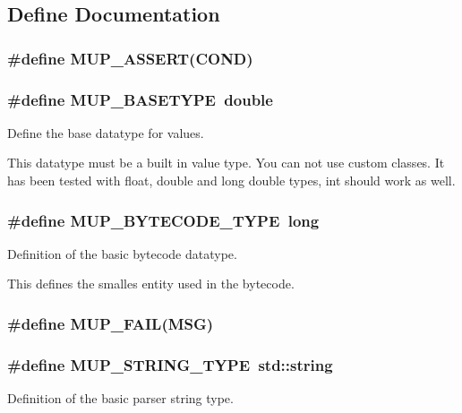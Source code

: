\subsection{Define Documentation}
\subsubsection[MUP\_\-ASSERT]{\setlength{\rightskip}{0pt plus 5cm}\#define MUP\_\-ASSERT(COND)}\label{muParserDef_8h_12c08d62c4a278b4e2ca3aad8e7af5e5}


\subsubsection[MUP\_\-BASETYPE]{\setlength{\rightskip}{0pt plus 5cm}\#define MUP\_\-BASETYPE~double}\label{muParserDef_8h_5a22a812cf29b119506daad01152f93a}


Define the base datatype for values. 

This datatype must be a built in value type. You can not use custom classes. It has been tested with float, double and long double types, int should work as well. 
\subsubsection[MUP\_\-BYTECODE\_\-TYPE]{\setlength{\rightskip}{0pt plus 5cm}\#define MUP\_\-BYTECODE\_\-TYPE~long}\label{muParserDef_8h_0f47e11fe6c191d2a956420a3f7174a8}


Definition of the basic bytecode datatype. 

This defines the smalles entity used in the bytecode. 
\subsubsection[MUP\_\-FAIL]{\setlength{\rightskip}{0pt plus 5cm}\#define MUP\_\-FAIL(MSG)}\label{muParserDef_8h_b8ab5fe61e39cd4e7e6449ca4361a442}


\subsubsection[MUP\_\-STRING\_\-TYPE]{\setlength{\rightskip}{0pt plus 5cm}\#define MUP\_\-STRING\_\-TYPE~std::string}\label{muParserDef_8h_1fc7b0394571c5a372932693798ba658}


Definition of the basic parser string type. 

